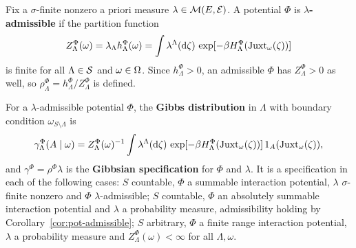 \begin{definition}
    \label{def:pot-partition-function}
    \leanok

    Fix a $\sigma$-finite nonzero a priori measure $\lambda \in \mathcal{M}(E, \mathcal{E})$. A
    potential $\Phi$ is \textbf{$\lambda$-admissible} if the partition function
    \[ Z_\Lambda^\Phi(\omega) = \lambda_\Lambda h^\Phi_\Lambda(\omega)
       = \int \lambda^\Lambda(\mathrm{d}\zeta)\,
         \exp[-\beta H^\Phi_\Lambda(\operatorname{Juxt}_{\omega}(\zeta))] \]
    is finite for all $\Lambda \in \mathcal{S}$ and $\omega \in \Omega$. Since $h^\Phi_\Lambda > 0$, an
    admissible $\Phi$ has $Z^\Phi_\Lambda > 0$ as well, so
    $\rho^\Phi_\Lambda = h^\Phi_\Lambda / Z^\Phi_\Lambda$ is defined.
\end{definition}

\begin{definition}
    \label{def:pot-gibbs-spec}
    \leanok

    For a $\lambda$-admissible potential $\Phi$, the \textbf{Gibbs distribution} in $\Lambda$
    with boundary condition $\omega_{S \setminus \Lambda}$ is
    \[ \gamma^\Phi_\Lambda(A \mid \omega) = Z^\Phi_\Lambda(\omega)^{-1}
        \int \lambda^\Lambda(\mathrm{d}\zeta)\,
        \exp[-\beta H^\Phi_\Lambda(\operatorname{Juxt}_{\omega}(\zeta))]\,
        1_A(\operatorname{Juxt}_{\omega}(\zeta)) , \]
    and $\gamma^\Phi = \rho^\Phi \lambda$ is the \textbf{Gibbsian specification} for $\Phi$ and
    $\lambda$. It is a specification in each of the following cases: $S$ countable, $\Phi$ a
    summable interaction potential, $\lambda$ $\sigma$-finite nonzero and $\Phi$
    $\lambda$-admissible; $S$ countable, $\Phi$ an absolutely summable interaction potential and
    $\lambda$ a probability measure, admissibility holding by
    Corollary~\ref{cor:pot-admissible}; $S$ arbitrary, $\Phi$ a finite range interaction
    potential, $\lambda$ a probability measure and $Z^\Phi_\Lambda(\omega) < \infty$ for all
    $\Lambda, \omega$.
\end{definition}

